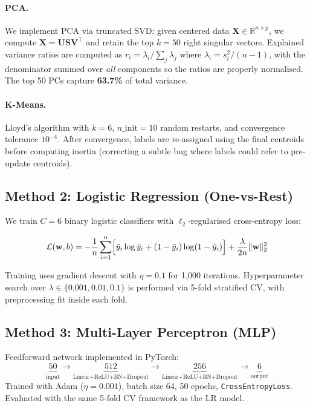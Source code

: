 \documentclass[11pt,letterpaper]{article}
\begin{document}
\paragraph{PCA.}
We implement PCA via truncated SVD: given centered data
$\mathbf{X} \in \mathbb{R}^{n \times p}$, we compute
$\mathbf{X} = \mathbf{U}\mathbf{S}\mathbf{V}^\top$ and retain the top $k=50$
right singular vectors.  Explained variance ratios are computed as
$r_i = \lambda_i / \sum_j \lambda_j$ where $\lambda_i = s_i^2 / (n-1)$, with
the denominator summed over \emph{all} components so the ratios are properly
normalised.  The top 50 PCs capture \textbf{63.7\%} of total variance.

\paragraph{K-Means.}
Lloyd's algorithm with $k{=}6$, $n\_\text{init}{=}10$ random restarts, and
convergence tolerance $10^{-4}$.  After convergence, labels are re-assigned
using the final centroids before computing inertia (correcting a subtle bug
where labels could refer to pre-update centroids).

\subsection{Method 2: Logistic Regression (One-vs-Rest)}

We train $C=6$ binary logistic classifiers with $\ell_2$-regularised
cross-entropy loss:

\begin{equation}
  \mathcal{L}(\mathbf{w}, b) =
    -\frac{1}{n}\sum_{i=1}^n \Bigl[\tilde{y}_i \log \hat{y}_i +
      (1-\tilde{y}_i)\log(1-\hat{y}_i)\Bigr]
    + \frac{\lambda}{2n} \|\mathbf{w}\|_2^2
\end{equation}

Training uses gradient descent with $\eta{=}0.1$ for 1,000 iterations.
Hyperparameter search over $\lambda \in \{0.001, 0.01, 0.1\}$ is performed via
5-fold stratified CV, with preprocessing fit inside each fold.

\subsection{Method 3: Multi-Layer Perceptron (MLP)}

Feedforward network implemented in PyTorch:
\begin{equation*}
  \underbrace{50}_{\text{input}} \to
  \underbrace{512}_{\text{Linear+ReLU+BN+Dropout}} \to
  \underbrace{256}_{\text{Linear+ReLU+BN+Dropout}} \to
  \underbrace{6}_{\text{output}}
\end{equation*}
Trained with Adam ($\eta{=}0.001$), batch size 64, 50 epochs,
\texttt{CrossEntropyLoss}.  Evaluated with the same 5-fold CV framework as
the LR model.
\end{document}
